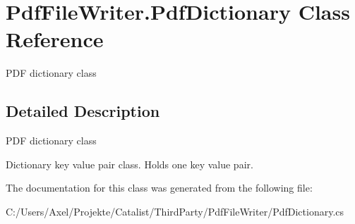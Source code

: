 \hypertarget{class_pdf_file_writer_1_1_pdf_dictionary}{}\section{Pdf\+File\+Writer.\+Pdf\+Dictionary Class Reference}
\label{class_pdf_file_writer_1_1_pdf_dictionary}


P\+DF dictionary class  




\subsection{Detailed Description}
P\+DF dictionary class 

Dictionary key value pair class. Holds one key value pair. 

The documentation for this class was generated from the following file\+:\begin{DoxyCompactItemize}
\item 
C\+:/\+Users/\+Axel/\+Projekte/\+Catalist/\+Third\+Party/\+Pdf\+File\+Writer/Pdf\+Dictionary.\+cs\end{DoxyCompactItemize}
